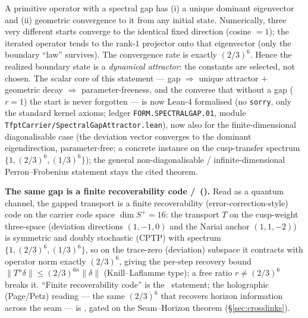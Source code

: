 \documentclass[11pt,a4paper]{article}
\begin{document}
\begin{keybox}
A primitive operator with a spectral gap has (i) a unique dominant eigenvector and (ii) geometric
convergence to it from any initial state. Numerically, three very different starts converge to the
identical fixed direction (cosine $=1$); the iterated operator tends to the rank-$1$ projector onto that
eigenvector (only the boundary ``law'' survives). The convergence rate is exactly $(2/3)^6$. Hence the
realized boundary state is a \emph{dynamical attractor}: the constants are selected, not chosen.
The scalar core of this statement --- gap $\Rightarrow$ unique attractor $+$ geometric decay $\Rightarrow$
parameter-freeness, and the converse that without a gap ($r{=}1$) the start is never forgotten --- is now
Lean-4 formalised (no \texttt{sorry}, only the standard kernel axioms; ledger \texttt{FORM.SPECTRALGAP.01},
module \texttt{TfptCarrier/SpectralGapAttractor.lean}), now also for the finite-dimensional diagonalisable case
(the deviation vector converges to the dominant eigendirection, parameter-free; a concrete instance on the
cusp-transfer spectrum $\{1,(2/3)^6,(1/3)^6\}$); the general non-diagonalisable / infinite-dimensional
Perron--Frobenius statement stays the cited theorem.
\end{keybox}

\noindent\textbf{The same gap is a finite recoverability code \mE/\mC\ ().} Read as
a quantum channel, the gapped transport is a finite recoverability (error-correction-style) code on the
carrier code space $\dim S^+=16$: the transport $T$ on the cusp-weight three-space (deviation directions
$(1,{-}1,0)$ and the Nariai anchor $(1,1,{-}2)$) is symmetric and doubly stochastic (CPTP) with spectrum
$\{1,(2/3)^6,(1/3)^6\}$, so on the trace-zero (deviation) subspace it contracts with operator norm exactly
$(2/3)^6$, giving the per-step recovery bound $\|T^n\delta\|\le(2/3)^{6n}\|\delta\|$ (Knill--Laflamme type);
a free ratio $r\neq(2/3)^6$ breaks it. ``Finite recoverability code'' is the \mE\ statement; the holographic
(Page/Petz) reading --- the same $(2/3)^6$ that recovers horizon information across the seam --- is \mC,
gated on the Seam--Horizon theorem (\S\ref{sec:crosslinks}).
\end{document}
